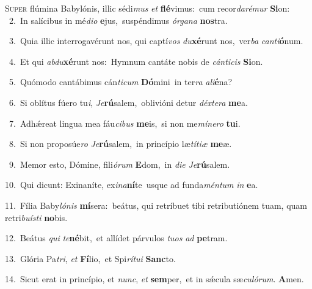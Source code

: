 \lettrine{\initial\textcolor{\initialcolor}{S}}{uper} flúmina Babylónis, illic sédi\textit{mus} \textit{et} \textbf{flé}\-vimus:~\star cum recor\-\textit{da}\-\textit{ré}\textit{mur} \textbf{Si}\-on:\\
{\numbfont\textcolor{\numbcolor}{~2.}}~In salícibus in mé\-\textit{di}\-\textit{o} \textbf{e}\-jus,~\star suspéndimus \textit{ór}\-\textit{ga}\textit{na} \textbf{nos}\-tra.\par
{\numbfont\textcolor{\numbcolor}{~3.}}~Quia illic interrogavérunt nos, qui captí\textit{vos} \textit{du}\-\textbf{xé}runt nos,~\star ver\textit{ba} \textit{can}\-\textit{ti}\textbf{ó}num.\par
{\numbfont\textcolor{\numbcolor}{~4.}}~Et qui \textit{ab}\-\textit{du}\textbf{xé}runt nos:~\star Hymnum cantáte nobis de \textit{cán}\-\textit{ti}\textit{cis} \textbf{Si}\-on.\par
{\numbfont\textcolor{\numbcolor}{~5.}}~Quómodo cantábimus cán\-\textit{ti}\-\textit{cum} \textbf{Dó}\-mini~\star in ter\textit{ra} \textit{a}\-\textit{li}\textbf{é}na?\par
{\numbfont\textcolor{\numbcolor}{~6.}}~Si oblítus fúero tu\-\textit{i}\-, \textit{Je}\-\textbf{rú}salem,~\star oblivióni detur \textit{déx}\-\textit{te}\textit{ra} \textbf{me}\-a.\par
{\numbfont\textcolor{\numbcolor}{~7.}}~Adhǽreat lingua mea fáu\-\textit{ci}\-\textit{bus} \textbf{me}\-is,~\star si non me\-\textit{mí}\-\textit{ne}\textit{ro} \textbf{tu}\-i.\par
{\numbfont\textcolor{\numbcolor}{~8.}}~Si non proposúe\textit{ro} \textit{Je}\-\textbf{rú}salem,~\star in princípio læ\-\textit{tí}\-\textit{ti}\textit{æ} \textbf{me}\-æ.\par
{\numbfont\textcolor{\numbcolor}{~9.}}~Memor esto, Dómine, fili\-\textit{ó}\-\textit{rum} \textbf{E}\-dom,~\star in \textit{di}\-\textit{e} \textit{Je}\-\textbf{rú}salem.\par
{\numbfont\textcolor{\numbcolor}{10.}}~Qui dicunt: Exinaníte, ex\-\textit{i}\-\textit{na}\textbf{ní}te~\star usque ad funda\-\textit{mén}\-\textit{tum} \textit{in} \textbf{e}\-a.\par
{\numbfont\textcolor{\numbcolor}{11.}}~Fília Baby\-\textit{ló}\-\textit{nis} \textbf{mí}\-sera:~\star beátus, qui retríbuet tibi retributiónem tuam, quam retri\-\textit{bu}\-\textit{ís}\textit{ti} \textbf{no}\-bis.\par
{\numbfont\textcolor{\numbcolor}{12.}}~Beátus \textit{qui} \textit{te}\-\textbf{né}bit,~\star et allídet párvulos \textit{tu}\-\textit{os} \textit{ad} \textbf{pe}\-tram.\par
{\numbfont\textcolor{\numbcolor}{13.}}~Glória Pa\-\textit{tri}\-, \textit{et} \textbf{Fí}\-lio,~\star et Spi\-\textit{rí}\-\textit{tu}\textit{i} \textbf{Sanc}\-to.\par
{\numbfont\textcolor{\numbcolor}{14.}}~Sicut erat in princípio, et \textit{nunc}\-, \textit{et} \textbf{sem}\-per,~\star et in sǽcula sæ\-\textit{cu}\-\textit{ló}\textit{rum}. \textbf{A}\-men.\par
